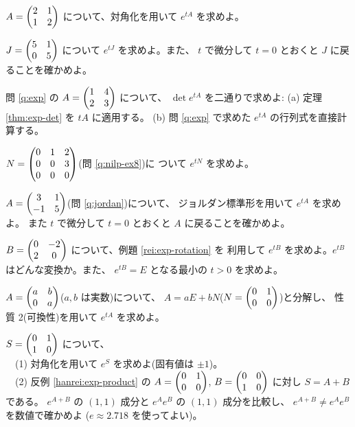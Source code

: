 \begin{mondai}[基本]\label{q:exp-ex2}
$A = \begin{pmatrix}2 & 1 \\ 1 & 2\end{pmatrix}$ について、対角化を用いて $e^{tA}$ を求めよ。
\end{mondai}

\begin{mondai}[基本]\label{q:exp-ex3}
$J = \begin{pmatrix}5 & 1 \\ 0 & 5\end{pmatrix}$ について $e^{tJ}$ を求めよ。また、
$t$ で微分して $t = 0$ とおくと $J$ に戻ることを確かめよ。
\end{mondai}

\begin{mondai}[基本]\label{q:exp-ex4}
問 \ref{q:exp} の $A = \begin{pmatrix}1 & 4 \\ 2 & 3\end{pmatrix}$ について、
$\det e^{tA}$ を二通りで求めよ:
(a) 定理 \ref{thm:exp-det} を $tA$ に適用する。
(b) 問 \ref{q:exp} で求めた $e^{tA}$ の行列式を直接計算する。
\end{mondai}

\begin{mondai}[標準]\label{q:exp-ex5}
$N = \begin{pmatrix}0 & 1 & 2 \\ 0 & 0 & 3 \\ 0 & 0 & 0\end{pmatrix}$(問 \ref{q:nilp-ex8})に
ついて $e^{tN}$ を求めよ。
\end{mondai}

\begin{mondai}[標準]\label{q:exp-ex6}
$A = \begin{pmatrix}3 & 1 \\ -1 & 5\end{pmatrix}$(問 \ref{q:jordan})について、
ジョルダン標準形を用いて $e^{tA}$ を求めよ。
また $t$ で微分して $t = 0$ とおくと $A$ に戻ることを確かめよ。
\end{mondai}

\begin{mondai}[標準]\label{q:exp-ex7}
$B = \begin{pmatrix}0 & -2 \\ 2 & 0\end{pmatrix}$ について、例題 \ref{rei:exp-rotation} を
利用して $e^{tB}$ を求めよ。$e^{tB}$ はどんな変換か。また、
$e^{tB} = E$ となる最小の $t > 0$ を求めよ。
\end{mondai}

\begin{mondai}[標準]\label{q:exp-ex8}
$A = \begin{pmatrix}a & b \\ 0 & a\end{pmatrix}$($a, b$ は実数)について、
$A = aE + bN$($N = \begin{pmatrix}0 & 1 \\ 0 & 0\end{pmatrix}$)と分解し、
性質 2(可換性)を用いて $e^{tA}$ を求めよ。
\end{mondai}

\begin{mondai}[発展]\label{q:exp-ex9}
$S = \begin{pmatrix}0 & 1 \\ 1 & 0\end{pmatrix}$ について、\\
　(1) 対角化を用いて $e^{S}$ を求めよ(固有値は $\pm 1$)。\\
　(2) 反例 \ref{hanrei:exp-product} の $A = \begin{pmatrix}0 & 1 \\ 0 & 0\end{pmatrix}$,
$B = \begin{pmatrix}0 & 0 \\ 1 & 0\end{pmatrix}$ に対し $S = A + B$ である。
$e^{A+B}$ の $(1,1)$ 成分と $e^{A}e^{B}$ の $(1,1)$ 成分を比較し、
$e^{A+B} \neq e^{A}e^{B}$ を数値で確かめよ
($e \approx 2.718$ を使ってよい)。
\end{mondai}

